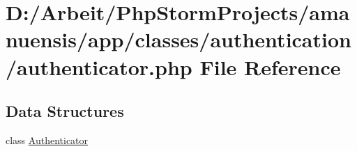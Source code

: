 \hypertarget{a00084}{}\section{D\+:/\+Arbeit/\+Php\+Storm\+Projects/amanuensis/app/classes/authentication/authenticator.php File Reference}
\label{a00084}
\subsection*{Data Structures}
\begin{DoxyCompactItemize}
\item 
class \hyperlink{a00013}{Authenticator}
\end{DoxyCompactItemize}
